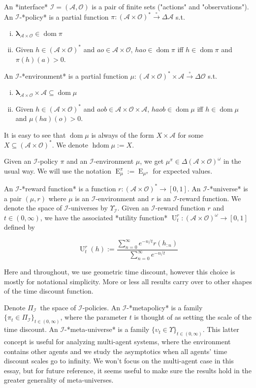 \documentclass[a4paper]{article}
\DeclareMathOperator{\Dom}{dom}
\DeclareMathOperator{\E}{E}
\newcommand{\Estr}{\boldsymbol{\lambda}}
\newcommand{\PF}{\xrightarrow{\circ}}
\newcommand{\Ob}{\mathcal{O}}
\newcommand{\A}{\mathcal{A}}
\newcommand{\I}{\mathcal{I}}
\newcommand{\FH}{(\A \times \Ob)^*}
\newcommand{\IH}{(\A \times \Ob)^\omega}
\DeclareMathOperator{\HD}{hdom}
\newcommand{\Ut}{\operatorname{U}}
\begin{document}
An *interface* $\I = (\A,\Ob)$ is a pair of finite sets  ("actions" and "observations"). An $\I$-*policy* is a partial function $\pi: \FH \PF \Delta\A$ s.t.

\begin{enumerate}[i.]

\item $\Estr_{\A \times \Ob} \in \Dom \pi$
\item Given $h \in \FH$ and $ao \in \A \times \Ob$, $hao \in \Dom \pi$ iff $h \in \Dom \pi$ and $\pi(h)(a) > 0$.

\end{enumerate}

An $\I$-*environment* is a partial function $\mu: \FH \times \A \PF \Delta\Ob$ s.t. 

\begin{enumerate}[i.]

\item $\Estr_{\A \times \Ob} \times \A \subseteq \Dom \mu$
\item Given $h \in \FH$ and $aob \in \A \times \Ob \times \A$, $haob \in \Dom \mu$ iff $h \in \Dom \mu$ and $\mu(ha)(o) > 0$.

\end{enumerate}

It is easy to see that $\Dom \mu$ is always of the form $X \times \A$ for some $X \subseteq \FH$. We denote $\HD \mu := X$.

Given an $\I$-policy $\pi$ and an $\I$-environment $\mu$, we get $\mu^\pi \in \Delta\IH$ in the usual way. We will use the notation $\E_\mu^\pi := \E_{\mu^\pi}$ for expected values.

An $\I$-*reward function* is a function $r: (\A \times \Ob)^* \rightarrow [0,1]$. An $\I$-*universe* is a pair $(\mu,r)$ where $\mu$ is an $\I$-environment and $r$ is an $\I$-reward function. We denote the space of $\I$-universes by $\Upsilon_\I$. Given an $\I$-reward function $r$ and $t \in (0,\infty)$, we have the associated *utility function* $\Ut_t^r: \IH \rightarrow [0,1]$ defined by

$$\Ut_t^{r}(h):=\frac{\sum_{n=0}^\infty e^{-n/t} r(h_{:n})}{\sum_{n=0}^\infty e^{-n/t}}$$

Here and throughout, we use geometric time discount, however this choice is mostly for notational simplicity. More or less all results carry over to other shapes of the time discount function.

Denote $\Pi_{\I}$\ the space of $\I$-policies. An $\I$-*metapolicy* is a family $\{\pi_t \in \Pi_\I\}_{t \in (0, \infty)}$, where the parameter $t$ is thought of as setting the scale of the time discount. An $\I$-*meta-universe* is a family $\{\upsilon_t \in \Upsilon\}_{t \in (0, \infty)}$. This latter concept is useful for analyzing multi-agent systems, where the environment contains other agents and we study the asymptotics when all agents' time discount scales go to infinity. We won't focus on the multi-agent case in this essay, but for future reference, it seems useful to make sure the results hold in the greater generality of meta-universes.
\end{document}

